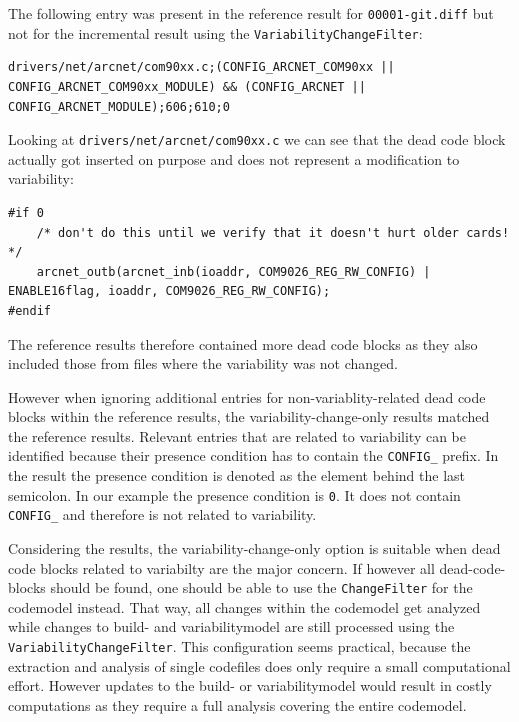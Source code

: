 \documentclass[a4paper]{article}
\begin{document}
The following entry was present in the reference result for \texttt{00001-git.diff} but not for the incremental result using the \texttt{VariabilityChangeFilter}:

\begin{lstlisting}
drivers/net/arcnet/com90xx.c;(CONFIG_ARCNET_COM90xx || CONFIG_ARCNET_COM90xx_MODULE) && (CONFIG_ARCNET || CONFIG_ARCNET_MODULE);606;610;0
\end{lstlisting}

Looking at \texttt{drivers/net/arcnet/com90xx.c} we can see that the dead code block actually got inserted on purpose and does not represent a modification to variability:

\begin{lstlisting}
#if 0
    /* don't do this until we verify that it doesn't hurt older cards! */
    arcnet_outb(arcnet_inb(ioaddr, COM9026_REG_RW_CONFIG) | ENABLE16flag, ioaddr, COM9026_REG_RW_CONFIG);
#endif
\end{lstlisting}

The reference results therefore contained more dead code blocks as they also included those from files where the variability was not changed. 

However when ignoring additional entries for non-variablity-related dead code blocks within the reference results, the variability-change-only results matched the reference results. Relevant entries that are related to variability can be identified because their presence condition has to contain the \texttt{CONFIG\_} prefix. In the result the presence condition is denoted as the element behind the last semicolon. In our example the presence condition is \texttt{0}. It does not contain \texttt{CONFIG\_} and therefore is not related to variability.

Considering the results, the variability-change-only option is suitable when dead code blocks related to variabilty are the major concern. If however all dead-code-blocks should be found, one should be able to use the \texttt{ChangeFilter} for the codemodel instead. That way, all changes within the codemodel get analyzed while changes to build- and variabilitymodel are still processed using the \texttt{VariabilityChangeFilter}. This configuration seems practical, because the extraction and analysis of single codefiles does only require a small computational effort. However updates to the build- or variabilitymodel would result in costly computations as they require a full analysis covering the entire codemodel.
\end{document}
